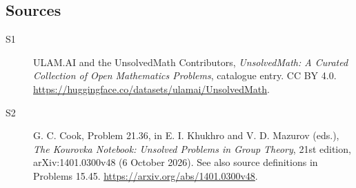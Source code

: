 \documentclass[11pt]{article}
\begin{document}
\subsection{Sources}
\begin{description}
\item[\hypertarget{source:statement:1}{S1}] ULAM.AI and the UnsolvedMath Contributors, \emph{UnsolvedMath: A Curated Collection of Open Mathematics Problems}, catalogue entry. CC BY 4.0. \url{https://huggingface.co/datasets/ulamai/UnsolvedMath}.
\item[\hypertarget{source:statement:2}{S2}] G. C. Cook, Problem 21.36, in E. I. Khukhro and V. D. Mazurov (eds.), \emph{The Kourovka Notebook: Unsolved Problems in Group Theory}, 21st edition, arXiv:1401.0300v48 (6 October 2026). See also source definitions in Problems 15.45. \url{https://arxiv.org/abs/1401.0300v48}.
\end{description}
\label{end:statement}
\end{document}
